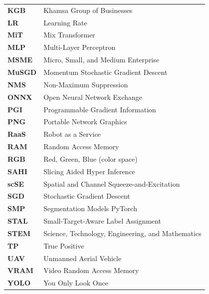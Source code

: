 \begin{longtable}{@{} >{\bfseries}p{3cm} p{10.5cm} @{}}
 KGB     & Khamsa Group of Businesses \\
 LR      & Learning Rate \\
 MiT     & Mix Transformer \\
 MLP     & Multi-Layer Perceptron \\
 MSME    & Micro, Small, and Medium Enterprise \\
 MuSGD   & Momentum Stochastic Gradient Descent \\
 NMS     & Non-Maximum Suppression \\
 ONNX    & Open Neural Network Exchange \\
 PGI     & Programmable Gradient Information \\
 PNG     & Portable Network Graphics \\
 RaaS    & Robot as a Service \\
 RAM     & Random Access Memory \\
 RGB     & Red, Green, Blue (color space) \\
 SAHI    & Slicing Aided Hyper Inference \\
 scSE    & Spatial and Channel Squeeze-and-Excitation \\
 SGD     & Stochastic Gradient Descent \\
 SMP     & Segmentation Models PyTorch \\
 STAL    & Small-Target-Aware Label Assignment \\
 STEM    & Science, Technology, Engineering, and Mathematics \\
 TP      & True Positive \\
 UAV     & Unmanned Aerial Vehicle \\
 VRAM    & Video Random Access Memory \\
 YOLO    & You Only Look Once \\
\end{longtable}
\clearpage
